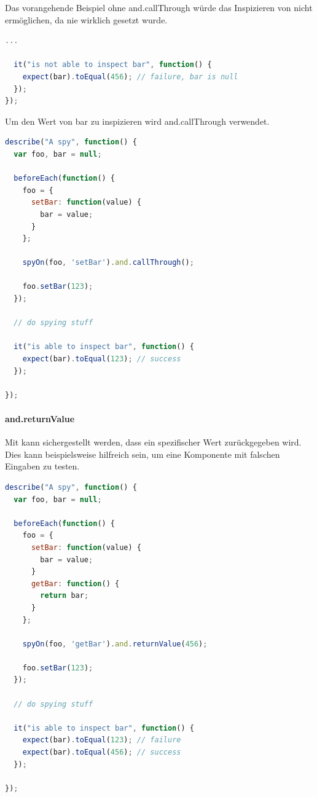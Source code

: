 {Das vorangehende Beispiel ohne and.callThrough würde das Inspizieren von  nicht ermöglichen, da  nie wirklich gesetzt wurde.
\begin{lstlisting}[language=JavaScript]
  ...

  it("is not able to inspect bar", function() {
    expect(bar).toEqual(456); // failure, bar is null
  });
});
\end{lstlisting}

Um den Wert von bar zu inspizieren wird and.callThrough verwendet.
\begin{lstlisting}[language=JavaScript]
describe("A spy", function() {
  var foo, bar = null;

  beforeEach(function() {
    foo = {
      setBar: function(value) {
        bar = value;
      }
    };

    spyOn(foo, 'setBar').and.callThrough();

    foo.setBar(123);
  });

  // do spying stuff

  it("is able to inspect bar", function() {
    expect(bar).toEqual(123); // success
  });

});
\end{lstlisting}

\paragraph{and.returnValue}
Mit  kann sichergestellt werden, dass ein spezifischer Wert zurückgegeben wird. Dies kann beispielsweise hilfreich sein, um eine Komponente mit falschen Eingaben zu testen.

\begin{lstlisting}[language=JavaScript]
describe("A spy", function() {
  var foo, bar = null;

  beforeEach(function() {
    foo = {
      setBar: function(value) {
        bar = value;
      }
      getBar: function() {
        return bar;
      }
    };

    spyOn(foo, 'getBar').and.returnValue(456);

    foo.setBar(123);
  });

  // do spying stuff

  it("is able to inspect bar", function() {
    expect(bar).toEqual(123); // failure
    expect(bar).toEqual(456); // success
  });

});
\end{lstlisting}

}
